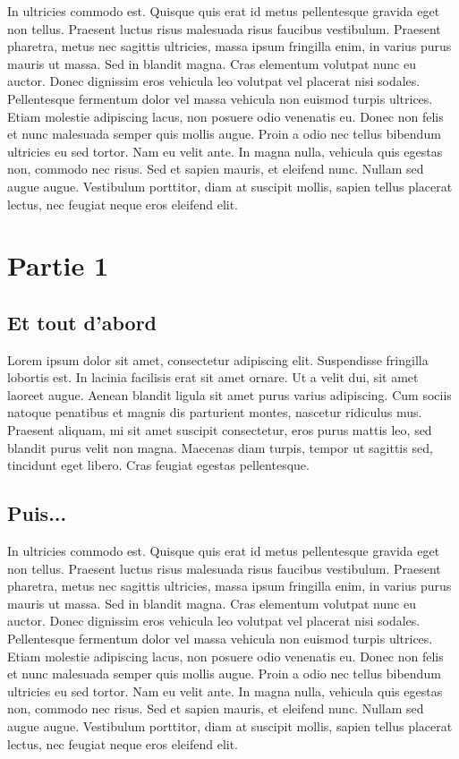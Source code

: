 \documentclass[a4paper,12pt]{report}
\begin{document}
In ultricies commodo est. Quisque quis erat id metus pellentesque
gravida eget non tellus. Praesent luctus risus malesuada risus
faucibus vestibulum. Praesent pharetra, metus nec sagittis ultricies,
massa ipsum fringilla enim, in varius purus mauris ut massa. Sed in
blandit magna. Cras elementum volutpat nunc eu auctor. Donec dignissim
eros vehicula leo volutpat vel placerat nisi sodales. Pellentesque
fermentum dolor vel massa vehicula non euismod turpis ultrices. Etiam
molestie adipiscing lacus, non posuere odio venenatis eu. Donec non
felis et nunc malesuada semper quis mollis augue. Proin a odio nec
tellus bibendum ultricies eu sed tortor. Nam eu velit ante. In magna
nulla, vehicula quis egestas non, commodo nec risus. Sed et sapien
mauris, et eleifend nunc. Nullam sed augue augue. Vestibulum
porttitor, diam at suscipit mollis, sapien tellus placerat lectus, nec
feugiat neque eros eleifend elit.

\chapter{Partie 1}
\section{Et tout d'abord}
Lorem ipsum dolor sit amet, consectetur adipiscing elit. Suspendisse
fringilla lobortis est. In lacinia facilisis erat sit amet ornare. Ut
a velit dui, sit amet laoreet augue. Aenean blandit ligula sit amet
purus varius adipiscing. Cum sociis natoque penatibus et magnis dis
parturient montes, nascetur ridiculus mus. Praesent aliquam, mi sit
amet suscipit consectetur, eros purus mattis leo, sed blandit purus
velit non magna. Maecenas diam turpis, tempor ut sagittis sed,
tincidunt eget libero. Cras feugiat egestas pellentesque.

\section{Puis...}
In ultricies commodo est. Quisque quis erat id metus pellentesque
gravida eget non tellus. Praesent luctus risus malesuada risus
faucibus vestibulum. Praesent pharetra, metus nec sagittis ultricies,
massa ipsum fringilla enim, in varius purus mauris ut massa. Sed in
blandit magna. Cras elementum volutpat nunc eu auctor. Donec dignissim
eros vehicula leo volutpat vel placerat nisi sodales. Pellentesque
fermentum dolor vel massa vehicula non euismod turpis ultrices. Etiam
molestie adipiscing lacus, non posuere odio venenatis eu. Donec non
felis et nunc malesuada semper quis mollis augue. Proin a odio nec
tellus bibendum ultricies eu sed tortor. Nam eu velit ante. In magna
nulla, vehicula quis egestas non, commodo nec risus. Sed et sapien
mauris, et eleifend nunc. Nullam sed augue augue. Vestibulum
porttitor, diam at suscipit mollis, sapien tellus placerat lectus, nec
feugiat neque eros eleifend elit.
\end{document}
